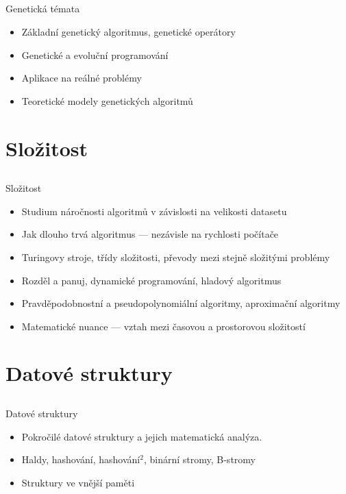 \documentclass{beamer}
\begin{document}
\subsection{}
\begin{frame}{Genetická témata}
\begin{itemize}
\item Základní genetický algoritmus, genetické operátory
\item Genetické a evoluční programování
\item Aplikace na reálné problémy
\item Teoretické modely genetických algoritmů
\end{itemize}
\end{frame}

\section{Složitost}

\subsection{}
\begin{frame}{Složitost}
\begin{itemize}
\item Studium náročnosti algoritmů v závislosti na velikosti datasetu
\item Jak dlouho trvá algoritmus --- nezávisle na rychlosti počítače
\item Turingovy stroje, třídy složitosti, převody mezi stejně složitými problémy
\item Rozděl a panuj, dynamické programování, hladový algoritmus
\item Pravděpodobnostní a pseudopolynomiální algoritmy, aproximační algoritmy
\item Matematické nuance --- vztah mezi časovou a prostorovou složitostí
\end{itemize}
\end{frame}

\section{Datové struktury}

\subsection{}
\begin{frame}{Datové struktury}
\begin{itemize}
\item Pokročilé datové struktury a jejich matematická analýza.
\item Haldy, hashování, hashování$^2$, binární stromy, B-stromy
\item Struktury ve vnější paměti
\end{itemize}
\end{frame}
\end{document}
